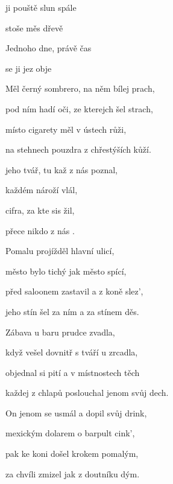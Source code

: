 

\zs
{}ji pouště slun spále

stoše  měs dřevě

Jednoho dne, právě čas  

se ji  jez obje
\ks

\zs
Měl černý sombrero, na něm bílej prach,

pod ním hadí oči, ze kterejch šel strach,

místo cigarety měl v ústech růži,

na stehnech pouzdra z chřestýších kůží.
\ks

\zr
{} jeho tvář, tu kaž z nás poznal,

 každém nároží  vlál,

 cifra, za kte sis žil,

 přece nikdo z nás .
\kr

\zs
Pomalu projížděl hlavní ulicí,

město bylo tichý jak město spící,

před saloonem zastavil a z koně slez',

jeho stín šel za ním a za stínem děs.
\ks

\zs
Zábava u baru prudce zvadla,

když vešel dovnitř s tváří u zrcadla,

objednal si pití a v místnostech těch

každej z chlapů poslouchal jenom svůj dech.
\ks

\zr  \kr

\zs
On jenom se usmál a dopil svůj drink,

mexickým dolarem o barpult cink',

pak ke koni došel krokem pomalým,

za chvíli zmizel jak z doutníku dým.
\ks

\kp







